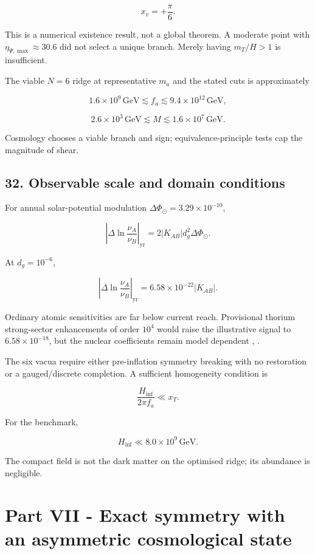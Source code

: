 \documentclass[
]{article}
\begin{document}
\[
x_v=+\frac\pi6.
\]

This is a numerical existence result, not a global theorem. A moderate
point with \(\eta_{\Psi,\max}\approx30.6\) did not select a unique
branch. Merely having \(m_T/H>1\) is insufficient.

The viable \(N=6\) ridge at representative \(m_a\) and the stated cuts
is approximately

\[
1.6\times10^9\,\mathrm{GeV}
\lesssim f_a\lesssim
9.4\times10^{12}\,\mathrm{GeV},
\]

\[
2.6\times10^3\,\mathrm{GeV}
\lesssim M\lesssim
1.6\times10^7\,\mathrm{GeV}.
\]

Cosmology chooses a viable branch and sign; equivalence-principle tests
cap the magnitude of shear.

\subsection{32. Observable scale and domain
conditions}\label{observable-scale-and-domain-conditions}

For annual solar-potential modulation
\(\Delta\Phi_\odot=3.29\times10^{-10}\),

\[
\left|\Delta\ln\frac{\nu_A}{\nu_B}\right|_{\mathrm{yr}}
=2|K_{AB}|d_g^2\Delta\Phi_\odot.
\]

At \(d_g=10^{-6}\),

\[
\boxed{
\left|\Delta\ln\frac{\nu_A}{\nu_B}\right|_{\mathrm{yr}}
=6.58\times10^{-22}|K_{AB}|.
}
\]

Ordinary atomic sensitivities are far below current reach. Provisional
thorium strong-sector enhancements of order \(10^4\) would raise the
illustrative signal to \(6.58\times10^{-18}\), but the nuclear
coefficients remain model dependent
,
.

The six vacua require either pre-inflation symmetry breaking with no
restoration or a gauged/discrete completion. A sufficient homogeneity
condition is

\[
\frac{H_{\mathrm{inf}}}{2\pi f_a}\ll x_T.
\]

For the benchmark,

\[
H_{\mathrm{inf}}\ll8.0\times10^9\,\mathrm{GeV}.
\]

The compact field is not the dark matter on the optimised ridge; its
abundance is negligible.

\section{Part VII - Exact symmetry with an asymmetric cosmological
state}\label{part-vii---exact-symmetry-with-an-asymmetric-cosmological-state}
\end{document}
